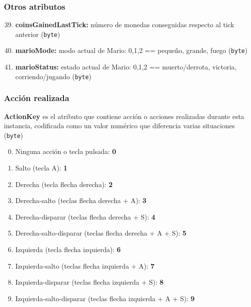 \documentclass[10pt, spanish, pdftex]{../.template/template}
\begin{document}
    \subsubsection{Otros atributos}
    \begin{enumerate}
        \setcounter{enumi}{38}
        \item \textbf{coinsGainedLastTick:} número de monedas conseguidas respecto al tick anterior (\texttt{byte})
        \item \textbf{marioMode:} modo actual de Mario: 0,1,2 == pequeño, grande, fuego (\texttt{byte})
        \item \textbf{marioStatus:} estado actual de Mario: 0,1,2 == muerto/derrota, victoria, corriendo/jugando (\texttt{byte})
    \end{enumerate}
    
    \subsubsection{Acción realizada}\label{acciones}
        \textbf{ActionKey} es el atributo que contiene acción o acciones realizadas durante esta instancia, codificada como un valor numérico que diferencia varias situaciones (\texttt{byte})
        \begin{enumerate}
            \setcounter{enumi}{-1}
            \item Ninguna acción o tecla pulsada: \textbf{0}
            \item Salto (tecla A): \textbf{1}
            \item Derecha (tecla flecha derecha): \textbf{2}
            \item Derecha-salto (teclas flecha derecha + A): \textbf{3}
            \item Derecha-disparar (teclas flecha derecha + S): \textbf{4}
            \item Derecha-salto-disparar (teclas flecha derecha + A + S): \textbf{5}
            \item Izquierda (tecla flecha izquierda): \textbf{6}
            \item Izquierda-salto (teclas flecha izquierda + A): \textbf{7}
            \item Izquierda-disparar (teclas flecha izquierda + S): \textbf{8}
            \item Izquierda-salto-disparar (teclas flecha izquierda + A + S): \textbf{9}
        \end{enumerate}
    
\end{document}
